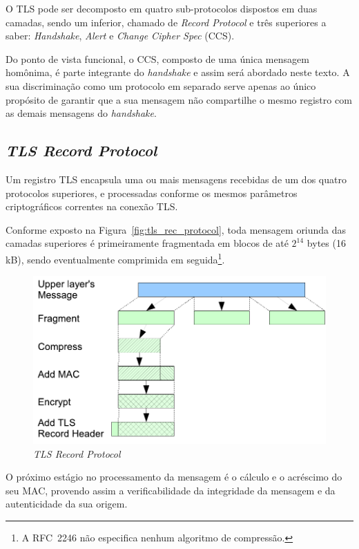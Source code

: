 O TLS pode ser decomposto em quatro sub-protocolos dispostos em duas camadas,
sendo um inferior, chamado de \emph{Record Protocol} e três superiores a saber:
\emph{Handshake}, \emph{Alert} e \emph{Change Cipher Spec} (CCS).

Do ponto de vista funcional, o CCS, composto de uma única mensagem homônima, é
parte integrante do \emph{handshake} e assim será abordado neste texto. A sua
discriminação como um protocolo em separado serve apenas ao único propósito de
garantir que a sua mensagem não compartilhe o mesmo registro com as demais
mensagens do \emph{handshake}.

\subsection{\emph{TLS Record Protocol}}

Um registro TLS encapsula uma ou mais mensagens recebidas de um dos
quatro protocolos superiores, e processadas conforme os mesmos parâmetros 
criptográficos correntes na conexão TLS. 

Conforme exposto na Figura~\vref{fig:tls_rec_protocol},
toda mensagem oriunda das camadas superiores é primeiramente
fragmentada em blocos de até $2^{14}$ bytes (16 kB), sendo eventualmente
comprimida em seguida\footnote{A RFC~2246 não especifica nenhum
algoritmo de compressão.}.

\begin{figure}[htbp]
    \centering
        \includegraphics[scale=0.7]{fig/tls_rec_protocol}
    \caption{\emph{TLS Record Protocol}}
    \label{fig:tls_rec_protocol}
\end{figure}

O próximo estágio no processamento da mensagem é o cálculo e o acréscimo do seu
\acs{MAC}, provendo assim a verificabilidade da integridade da mensagem e da
autenticidade da sua origem.

